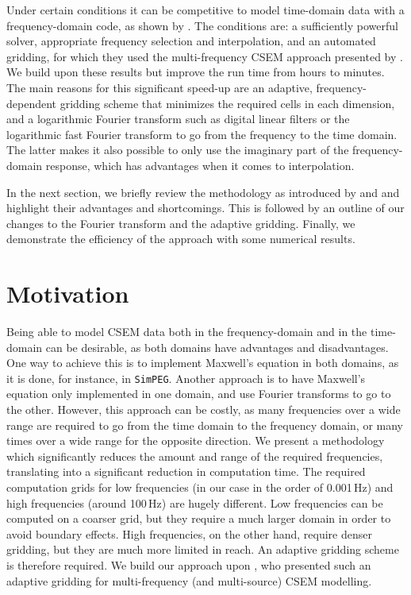 \documentclass[
    manuscript,
    revised,
  ]{geophysics}
\newcommand{\simpeg}{\texttt{SimPEG}\xspace}
\begin{document}
Under certain conditions it can be competitive to model time-domain data with a
frequency-domain code, as shown by \cite{GEO.08.Mulder}. The conditions are: a
sufficiently powerful solver, appropriate frequency selection and
interpolation, and an automated gridding, for which they used the
multi-frequency CSEM approach presented by \cite{GEO.07.Plessix}. We build upon
these results but improve the run time from hours to minutes. The main reasons
for this significant speed-up are an adaptive, frequency-dependent gridding
scheme that minimizes the required cells in each dimension, and a logarithmic
Fourier transform such as digital linear filters \citep[DLF, ][]{GP.71.Ghosh}
or the logarithmic fast Fourier transform \citep[FFTLog, ][]{RAS.00.Hamilton}
to go from the frequency to the time domain. The latter makes it also possible
to only use the imaginary part of the frequency-domain response, which has
advantages when it comes to interpolation.

In the next section, we briefly review the methodology as introduced by
\cite{GEO.07.Plessix} and \cite{GEO.08.Mulder} and highlight their advantages
and shortcomings. This is followed by an outline of our changes to the Fourier
transform and the adaptive gridding. Finally, we demonstrate the efficiency of
the approach with some numerical results.

\section{Motivation}

Being able to model CSEM data both in the frequency-domain and in the
time-domain can be desirable, as both domains have advantages and
disadvantages. One way to achieve this is to implement Maxwell's equation in
both domains, as it is done, for instance, in \simpeg \citep{CAG.15.Cockett}.
Another approach is to have Maxwell's equation only implemented in one domain,
and use Fourier transforms to go to the other. However, this approach can be
costly, as many frequencies over a wide range are required to go from the time
domain to the frequency domain, or many times over a wide range for the
opposite direction. We present a methodology which significantly reduces the
amount and range of the required frequencies, translating into a significant
reduction in computation time. The required computation grids for low
frequencies (in our case in the order of 0.001\,Hz) and high frequencies
(around 100\,Hz) are hugely different. Low frequencies can be computed on a
coarser grid, but they require a much larger domain in order to avoid boundary
effects. High frequencies, on the other hand, require denser gridding, but they
are much more limited in reach. An adaptive gridding scheme is therefore
required. We build our approach upon \cite{GEO.07.Plessix}, who presented such
an adaptive gridding for multi-frequency (and multi-source) CSEM modelling.
\end{document}
